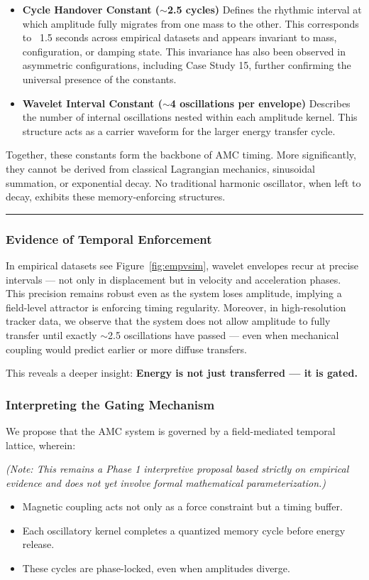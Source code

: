 \documentclass[10pt,aps,pre,onecolumn,superscriptaddress,notitlepage]{revtex4-2}
\begin{document}
\begin{itemize}
    \item \textbf{Cycle Handover Constant ($\sim$2.5 cycles)}
    Defines the rhythmic interval at which amplitude fully migrates from one mass to the other. This corresponds to ~1.5 seconds across empirical datasets and appears invariant to mass, configuration, or damping state. This invariance has also been observed in asymmetric configurations, including Case Study 15, further confirming the universal presence of the constants.
    \item \textbf{Wavelet Interval Constant ($\sim$4 oscillations per envelope)}
    Describes the number of internal oscillations nested within each amplitude kernel. This structure acts as a carrier waveform for the larger energy transfer cycle.
\end{itemize}
Together, these constants form the backbone of AMC timing. More significantly, they cannot be derived from classical Lagrangian mechanics, sinusoidal summation, or exponential decay. No traditional harmonic oscillator, when left to decay, exhibits these memory-enforcing structures.
\vspace{1em}
\hrule
\vspace{0.2em}
\subsubsection{Evidence of Temporal Enforcement}
In empirical datasets see Figure~\ref{fig:empvsim}, wavelet envelopes recur at precise intervals — not only in displacement but in velocity and acceleration phases. This precision remains robust even as the system loses amplitude, implying a field-level attractor is enforcing timing regularity.
Moreover, in high-resolution tracker data, we observe that the system does not allow amplitude to fully transfer until exactly $\sim$2.5 oscillations have passed — even when mechanical coupling would predict earlier or more diffuse transfers.

This reveals a deeper insight: \textbf{Energy is not just transferred — it is gated.} 

\subsubsection{Interpreting the Gating Mechanism}
We propose that the AMC system is governed by a field-mediated temporal lattice, wherein:

\textit{(Note: This remains a Phase 1 interpretive proposal based strictly on empirical evidence and does not yet involve formal mathematical parameterization.)}
\begin{itemize}
    \item Magnetic coupling acts not only as a force constraint but a timing buffer.
\item Each oscillatory kernel completes a quantized memory cycle before energy release.
\item These cycles are phase-locked, even when amplitudes diverge.

\end{itemize}
\end{document}
